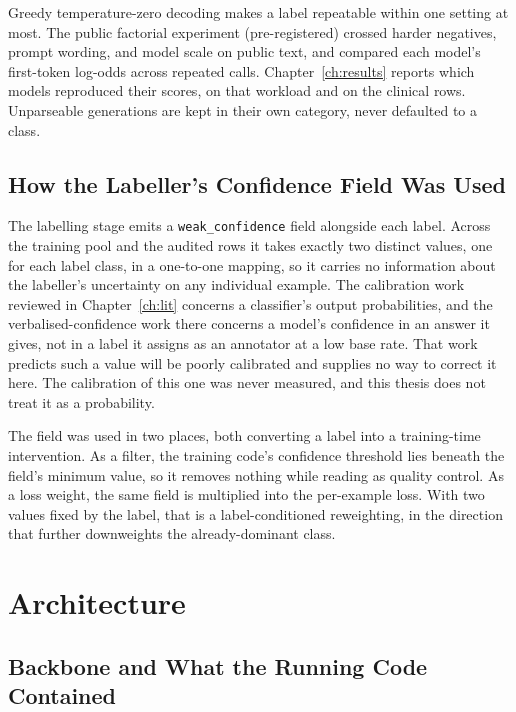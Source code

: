 Greedy temperature-zero decoding makes a label repeatable within one setting at most. The public
factorial experiment (pre-registered) crossed harder negatives, prompt wording, and model scale on
public text, and compared each model's first-token log-odds across repeated calls. Chapter~\ref{ch:results} reports which
models reproduced their scores, on that workload and on the clinical rows.
Unparseable generations are kept in their own category, never defaulted to a class.

\subsection{How the Labeller's Confidence Field Was Used}

The labelling stage emits a \texttt{weak\_confidence} field alongside each label. Across the
training pool and the audited rows it takes exactly two distinct values, one for each label class,
in a one-to-one mapping, so it carries no information about the labeller's uncertainty on
any individual example. The calibration work reviewed in
Chapter~\ref{ch:lit} \citep{guo2017calibration,zhao2021calibrate} concerns a classifier's output
probabilities, and the verbalised-confidence work there
\citep{kadavath2022know,tian2023askcalibration,xiong2024uncertainty} concerns a model's confidence
in an answer it gives, not in a label it assigns as an annotator at a low base rate. That work
predicts such a value will be poorly calibrated and supplies no way to correct it here. The
calibration of this one was never measured, and this thesis does not treat it as a probability.

The field was used in two places, both converting a label into a training-time intervention. As a filter, the training code's confidence threshold lies beneath the field's minimum
value, so it removes nothing while reading as quality control. As a loss weight, the same field is
multiplied into the per-example loss. With two values fixed by the label, that is a label-conditioned reweighting, in the direction that further downweights the already-dominant class.

\section{Architecture}
\label{sec:m-detector}

\subsection{Backbone and What the Running Code Contained}

